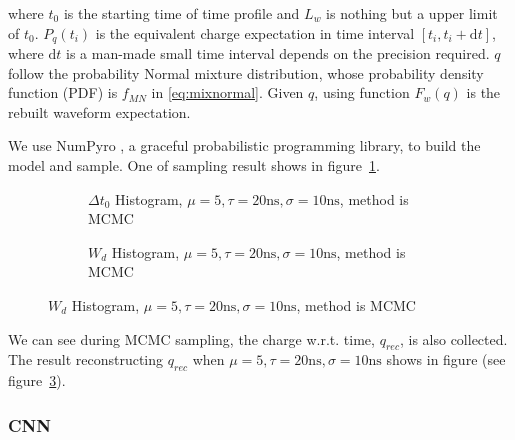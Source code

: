 where $t_{0}$ is the starting time of time profile and $L_{w}$ is nothing but a upper limit of $t_{0}$. $P_{q}(t_{i})$ is the equivalent charge expectation in time interval $[t_{i}, t_{i}+\mathrm{d}t]$, where $\mathrm{d}t$ is a man-made small time interval depends on the precision required. $q$ follow the probability Normal mixture distribution, whose probability density function (PDF) is $f_{MN}$ in \eqref{eq:mixnormal}. Given $q$, using function $F_{w}(q)$ is the rebuilt waveform expectation. 

We use NumPyro \cite{phan2019composable}, a graceful probabilistic programming library, to build the model and sample. One of sampling result shows in figure~\ref{fig:mcmcrec-t0hist}. 

\begin{figure}[H]
\begin{minipage}[t]{.5\textwidth}
\begin{figure}[H]
    \centering
    \resizebox{\textwidth}{!}{}
    \caption{\label{fig:mcmcrec-t0hist} $\Delta t_{0}$ Histogram, $\mu=5, \tau=20\mathrm{ns}, \sigma=10\mathrm{ns}$, method is MCMC}
\end{figure}
\end{minipage}
\begin{minipage}[t]{.5\textwidth}
\begin{figure}[H]
    \centering
    \resizebox{\textwidth}{!}{}
    \caption{\label{fig:mcmcrec-chargehist} $W_{d}$ Histogram, $\mu=5, \tau=20\mathrm{ns}, \sigma=10\mathrm{ns}$, method is MCMC}
\end{figure}
\end{minipage}
\end{figure}

We can see during MCMC sampling, the charge w.r.t. time, $q_{rec}$, is also collected. The result reconstructing $q_{rec}$ when $\mu=5, \tau=20\mathrm{ns}, \sigma=10\mathrm{ns}$ shows in figure (see figure~\ref{fig:mcmcrec-chargehist}). 

\subsubsection{CNN}


